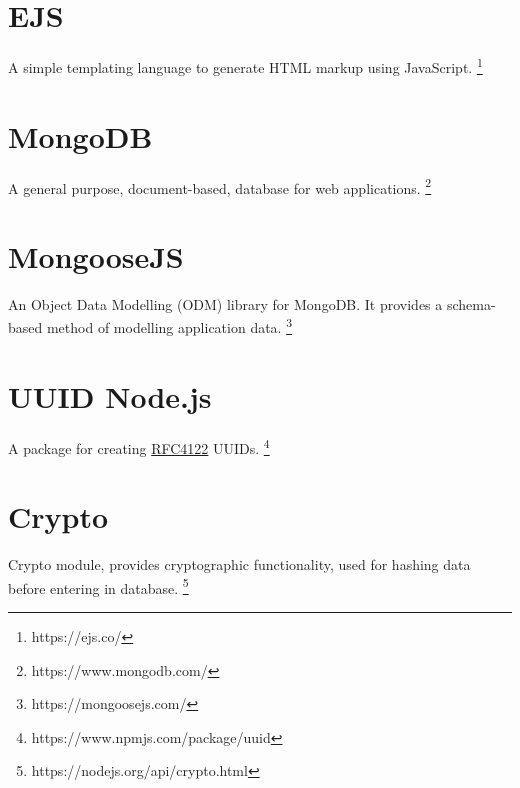 \section{EJS}
A simple templating language to generate HTML markup using JavaScript. \footnote{https://ejs.co/}
\label{appendix:ejs}

\section{MongoDB}
A general purpose, document-based, database for web applications. \footnote{https://www.mongodb.com/}

\section{MongooseJS}
An Object Data Modelling (ODM) library for MongoDB. It provides a schema-based method of modelling application data. \footnote{https://mongoosejs.com/}

\section{UUID Node.js}
A package for creating \href{https://datatracker.ietf.org/doc/html/rfc2986}{RFC4122} UUIDs. \footnote{https://www.npmjs.com/package/uuid} \label{appendix:uuid}

\section{Crypto}
Crypto module, provides cryptographic functionality, used for hashing data before entering in database. \footnote{https://nodejs.org/api/crypto.html} \label{appendix:crypto}